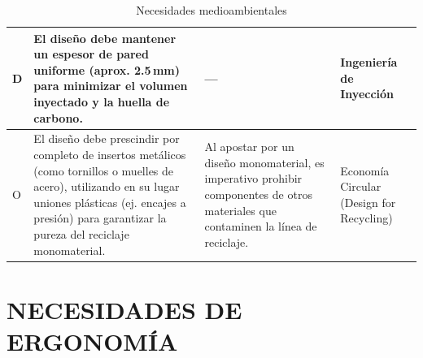 \documentclass[11pt,a4paper]{article}
\begin{document}
\begin{table}[H]
\begin{tabular}{|p{2.8cm}|p{5.5cm}|p{2.5cm}|p{3.0cm}|}
D & El diseño debe mantener un espesor de pared uniforme (aprox. 2.5\,mm) para minimizar el volumen inyectado y la huella de carbono. & --- & Ingeniería de Inyección \\
\hline
O & El diseño debe prescindir por completo de insertos metálicos (como tornillos o muelles de acero), utilizando en su lugar uniones plásticas (ej. encajes a presión) para garantizar la pureza del reciclaje monomaterial.& Al apostar por un diseño monomaterial, es imperativo prohibir componentes de otros materiales que contaminen la línea de reciclaje. & Economía Circular (Design for Recycling) \\
\hline
\end{tabular}
\caption{Necesidades medioambientales}
\end{table}

\newpage
\section{NECESIDADES DE ERGONOMÍA}

\vspace{0.5cm}
\end{document}
